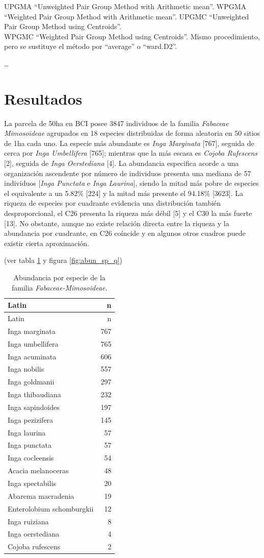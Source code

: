 \documentclass[11pt,]{article}
\begin{document}
UPGMA ``Unweighted Pair Group Method with Arithmetic mean''. WPGMA
``Weighted Pair Group Method with Arithmetic mean''. UPGMC ``Unweighted
Pair Group Method using Centroids''.\\
WPGMC ``Weighted Pair Group Method using Centroids''. \textbar{} Mismo
procedimiento, pero se sustituye el método por ``average'' o
``ward.D2''. \textbar{}

\ldots

\section{Resultados}\label{resultados}

La parcela de 50ha en BCI posee 3847 individuos de la familia
\emph{Fabaceae Mimosoideae} agrupados en 18 especies distribuidas de
forma aleatoria en 50 sitios de 1ha cada uno. La especie más abundante
es \emph{Inga Marginata} {[}767{]}, seguida de cerca por \emph{Inga
Umbellifera} {[}765{]}; mientras que la más escasa es \emph{Cojoba
Rufescens} {[}2{]}, seguida de \emph{Inga Oerstediana} {[}4{]}. La
abundancia especifica acorde a una organización ascendente por número de
individuos presenta una mediana de 57 individuos {[}\emph{Inga Punctata}
e \emph{Inga Laurina}{]}, siendo la mitad más pobre de especies el
equivalente a un 5.82\% {[}224{]} y la mitad más presente el 94.18\%
{[}3623{]}. La riqueza de especies por cuadrante evidencia una
distribución también desproporcional, el C26 presenta la riqueza más
débil {[}5{]} y el C30 la más fuerte {[}13{]}. No obstante, aunque no
existe relación directa entre la riqueza y la abundancia por cuadrante,
en C26 coíncide y en algunos otros cuadros puede existir cierta
aproximación.

(ver tabla \ref{tab:abun_sp} y figura \ref{fig:abun_sp_q})

\begin{longtable}[]{@{}lr@{}}
\caption{\label{tab:abun_sp}Abundancia por especie de la familia
\emph{Fabaceae-Mimosoideae}.}\tabularnewline
\toprule
Latin & n\tabularnewline
\midrule
\endfirsthead
\toprule
Latin & n\tabularnewline
\midrule
\endhead
Inga marginata & 767\tabularnewline
Inga umbellifera & 765\tabularnewline
Inga acuminata & 606\tabularnewline
Inga nobilis & 557\tabularnewline
Inga goldmanii & 297\tabularnewline
Inga thibaudiana & 232\tabularnewline
Inga sapindoides & 197\tabularnewline
Inga pezizifera & 145\tabularnewline
Inga laurina & 57\tabularnewline
Inga punctata & 57\tabularnewline
Inga cocleensis & 54\tabularnewline
Acacia melanoceras & 48\tabularnewline
Inga spectabilis & 20\tabularnewline
Abarema macradenia & 19\tabularnewline
Enterolobium schomburgkii & 12\tabularnewline
Inga ruiziana & 8\tabularnewline
Inga oerstediana & 4\tabularnewline
Cojoba rufescens & 2\tabularnewline
\bottomrule
\end{longtable}
\end{document}
